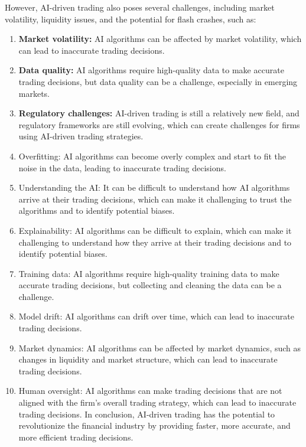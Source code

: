 \documentclass[
  letterpaper,
  DIV=11,
  numbers=noendperiod]{scrreprt}
\begin{document}

However, AI-driven trading also poses several challenges, including
market volatility, liquidity issues, and the potential for flash
crashes, such as:

\begin{enumerate}
\def\labelenumi{\arabic{enumi}.}
\item
  \textbf{Market volatility:} AI algorithms can be affected by market
  volatility, which can lead to inaccurate trading decisions.
\item
  \textbf{Data quality:} AI algorithms require high-quality data to make
  accurate trading decisions, but data quality can be a challenge,
  especially in emerging markets.
\item
  \textbf{Regulatory challenges:} AI-driven trading is still a
  relatively new field, and regulatory frameworks are still evolving,
  which can create challenges for firms using AI-driven trading
  strategies.
\item
  Overfitting: AI algorithms can become overly complex and start to fit
  the noise in the data, leading to inaccurate trading decisions.
\item
  Understanding the AI: It can be difficult to understand how AI
  algorithms arrive at their trading decisions, which can make it
  challenging to trust the algorithms and to identify potential biases.
\item
  Explainability: AI algorithms can be difficult to explain, which can
  make it challenging to understand how they arrive at their trading
  decisions and to identify potential biases.
\item
  Training data: AI algorithms require high-quality training data to
  make accurate trading decisions, but collecting and cleaning the data
  can be a challenge.
\item
  Model drift: AI algorithms can drift over time, which can lead to
  inaccurate trading decisions.
\item
  Market dynamics: AI algorithms can be affected by market dynamics,
  such as changes in liquidity and market structure, which can lead to
  inaccurate trading decisions.
\item
  Human oversight: AI algorithms can make trading decisions that are not
  aligned with the firm's overall trading strategy, which can lead to
  inaccurate trading decisions. In conclusion, AI-driven trading has the
  potential to revolutionize the financial industry by providing faster,
  more accurate, and more efficient trading decisions.
\end{enumerate}
\end{document}
